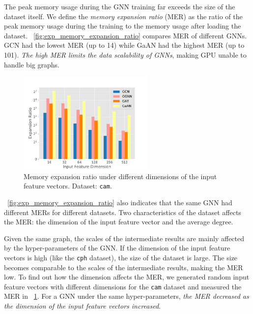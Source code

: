The peak memory usage during the GNN training far exceeds the size of the dataset itself.
We define the \emph{memory expansion ratio} (MER) as the ratio of the peak memory usage during the training to the memory usage after loading the dataset.
\figurename~\ref{fig:exp_memory_expansion_ratio} compares MER of different GNNs.
GCN had the lowest MER (up to 14) while GaAN had the highest MER (up to 101).
\emph{The high MER limits the data scalability of GNNs}, making GPU unable to handle big graphs.

\begin{figure}
    \centering
    \includegraphics[height=5cm]{figs/experiments/exp_memory_expansion_ratio_input_feature_dimension_com-amazon.pdf}
    \caption{Memory expansion ratio under different dimensions of the input feature vectors. Dataset: \texttt{cam}.}
    \label{fig:exp_memory_expension_ratio_input_feature_dimension}
\end{figure}

\figurename~\ref{fig:exp_memory_expansion_ratio} also indicates that the same GNN had different MERs for different datasets.
Two characteristics of the dataset affects the MER: the dimension of the input feature vector and the average degree.

Given the same graph, the scales of the intermediate results are mainly affected by the hyper-parameters of the GNN.
If the dimension of the input feature vectors is high (like the \texttt{cph} dataset), the size of the dataset is large.
The size becomes comparable to the scales of the intermediate results,  making the MER low.
To find out how the dimension affects the MER, we generated random input feature vectors with different dimensions for the \texttt{cam} dataset and measured the MER in \figurename~\ref{fig:exp_memory_expension_ratio_input_feature_dimension}.
For a GNN under the same hyper-parameters, \emph{the MER decreased as the dimension of the input feature vectors increased}.

